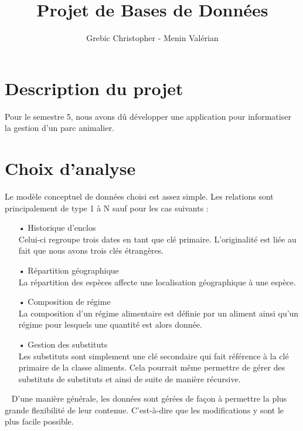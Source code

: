 \documentclass[12pt,a4paper,titlepage]{report}
\author{Grebic Christopher - Menin Valérian}
\title{Projet de Bases de Données}
\begin{document}
\maketitle

\section*{Description du projet}
Pour le semestre 5, nous avons dû développer une application pour informatiser la gestion d'un parc animalier.


\section*{Choix d'analyse}
Le modèle conceptuel de données choisi est assez simple. Les relations sont principalement de type 1 à N sauf pour les cas suivants :
\begin{itemize}
	\item[•] Historique d'enclos \\
	Celui-ci regroupe trois dates en tant que clé primaire. L'originalité est liée au fait que nous avons trois clés étrangères. 
	\item[•] Répartition géographique \\
	La répartition des espèces affecte une localisation géographique à une espèce.
	\item[•] Composition de régime \\
	La composition d'un régime alimentaire est définie par un aliment ainsi qu'un régime pour lesquels une quantité est alors donnée.
	\item[•] Gestion des substituts \\
	Les substituts sont simplement une clé secondaire qui fait référence à la clé primaire de la classe aliments. Cela pourrait même permettre de gérer des substituts de substituts et ainsi de suite de manière récursive.
\end{itemize}
 
~ \newline
D'une manière générale, les données sont gérées de façon à permettre la plus grande flexibilité de leur contenue. C'est-à-dire que les modifications y sont le plus facile possible.
\end{document}
